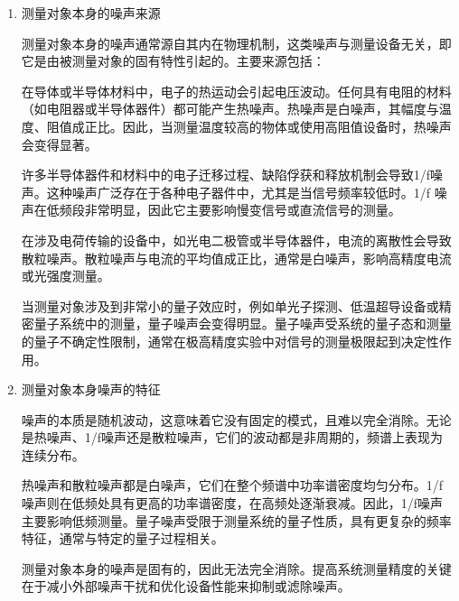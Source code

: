 \begin{enumerate}
	\item 测量对象本身的噪声来源
	
	测量对象本身的噪声通常源自其内在物理机制，这类噪声与测量设备无关，即它是由被测量对象的固有特性引起的。主要来源包括：
	
	在导体或半导体材料中，电子的热运动会引起电压波动。任何具有电阻的材料（如电阻器或半导体器件）都可能产生热噪声。热噪声是白噪声，其幅度与温度、阻值成正比。因此，当测量温度较高的物体或使用高阻值设备时，热噪声会变得显著。
	
	许多半导体器件和材料中的电子迁移过程、缺陷俘获和释放机制会导致1/f噪声。这种噪声广泛存在于各种电子器件中，尤其是当信号频率较低时。1/f 噪声在低频段非常明显，因此它主要影响慢变信号或直流信号的测量。
	
	在涉及电荷传输的设备中，如光电二极管或半导体器件，电流的离散性会导致散粒噪声。散粒噪声与电流的平均值成正比，通常是白噪声，影响高精度电流或光强度测量。
	
	当测量对象涉及到非常小的量子效应时，例如单光子探测、低温超导设备或精密量子系统中的测量，量子噪声会变得明显。量子噪声受系统的量子态和测量的量子不确定性限制，通常在极高精度实验中对信号的测量极限起到决定性作用。
	
	\item 测量对象本身噪声的特征
	
	噪声的本质是随机波动，这意味着它没有固定的模式，且难以完全消除。无论是热噪声、1/f噪声还是散粒噪声，它们的波动都是非周期的，频谱上表现为连续分布。
	
	热噪声和散粒噪声都是白噪声，它们在整个频谱中功率谱密度均匀分布。1/f噪声则在低频处具有更高的功率谱密度，在高频处逐渐衰减。因此，1/f噪声主要影响低频测量。量子噪声受限于测量系统的量子性质，具有更复杂的频率特征，通常与特定的量子过程相关。
	
	测量对象本身的噪声是固有的，因此无法完全消除。提高系统测量精度的关键在于减小外部噪声干扰和优化设备性能来抑制或滤除噪声。
\end{enumerate}

